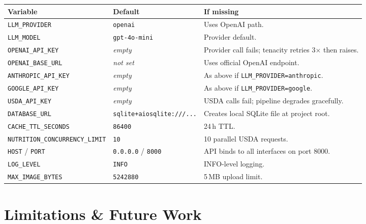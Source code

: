 \documentclass[11pt,a4paper]{article}
\begin{document}
\noindent
\begin{tabularx}{\textwidth}{@{} l l X @{}}
\toprule
\textbf{Variable} & \textbf{Default} & \textbf{If missing} \\
\midrule
\texttt{LLM\_PROVIDER} & \texttt{openai} & Uses OpenAI path. \\
\texttt{LLM\_MODEL} & \texttt{gpt-4o-mini} & Provider default. \\
\texttt{OPENAI\_API\_KEY} & \textit{empty} & Provider call fails; tenacity retries 3$\times$ then raises. \\
\texttt{OPENAI\_BASE\_URL} & \textit{not set} & Uses official OpenAI endpoint. \\
\texttt{ANTHROPIC\_API\_KEY} & \textit{empty} & As above if \texttt{LLM\_PROVIDER=anthropic}. \\
\texttt{GOOGLE\_API\_KEY} & \textit{empty} & As above if \texttt{LLM\_PROVIDER=google}. \\
\texttt{USDA\_API\_KEY} & \textit{empty} & USDA calls fail; pipeline degrades gracefully. \\
\texttt{DATABASE\_URL} & \texttt{sqlite+aiosqlite:///...} & Creates local SQLite file at project root. \\
\texttt{CACHE\_TTL\_SECONDS} & \texttt{86400} & 24\,h TTL. \\
\texttt{NUTRITION\_CONCURRENCY\_LIMIT} & \texttt{10} & 10 parallel USDA requests. \\
\texttt{HOST} / \texttt{PORT} & \texttt{0.0.0.0} / \texttt{8000} & API binds to all interfaces on port 8000. \\
\texttt{LOG\_LEVEL} & \texttt{INFO} & INFO-level logging. \\
\texttt{MAX\_IMAGE\_BYTES} & \texttt{5242880} & 5\,MB upload limit. \\
\bottomrule
\end{tabularx}

\section{Limitations \& Future Work}\label{sec:limits}
\end{document}
